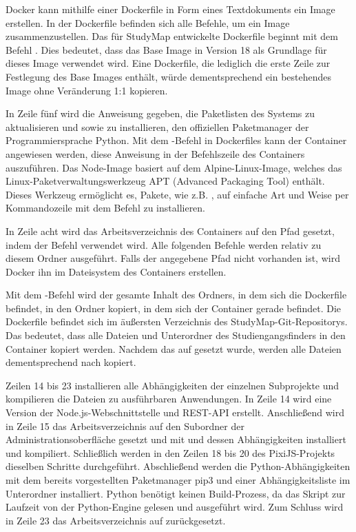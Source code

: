 Docker kann mithilfe einer Dockerfile in Form eines Textdokuments ein Image erstellen. In der Dockerfile befinden sich alle Befehle, um ein Image zusammenzustellen. \parencite{docker_inc_dockerfile_2024} Das für StudyMap entwickelte Dockerfile beginnt mit dem Befehl . Dies bedeutet, dass das Base Image  in Version 18 als Grundlage für dieses Image verwendet wird. Eine Dockerfile, die lediglich die erste Zeile zur Festlegung des Base Images enthält, würde dementsprechend ein bestehendes Image ohne Veränderung 1:1 kopieren. \parencite{the_nodejs_docker_team_node_2024}

In Zeile fünf wird die Anweisung gegeben, die Paketlisten des Systems zu aktualisieren und  sowie  zu installieren, den offiziellen Paketmanager der Programmiersprache Python. \parencite{the_pip_developers_pip_2024} Mit dem -Befehl in Dockerfiles kann der Container angewiesen werden, diese Anweisung in der Befehlszeile des Containers auszuführen. Das Node-Image basiert auf dem Alpine-Linux-Image, welches das Linux-Paketverwaltungswerkzeug APT (Advanced Packaging Tool) enthält. \parencite{the_nodejs_docker_team_node_2024} Dieses Werkzeug ermöglicht es, Pakete, wie z.B. , auf einfache Art und Weise per Kommandozeile mit dem Befehl  zu installieren. \parencite{canonical_ltd_ubuntu_package_2024}

In Zeile acht wird das Arbeitsverzeichnis des Containers auf den Pfad  gesetzt, indem der Befehl  verwendet wird. Alle folgenden Befehle werden relativ zu diesem Ordner ausgeführt. Falls der angegebene Pfad nicht vorhanden ist, wird Docker ihn im Dateisystem des Containers erstellen. \parencite{docker_inc_dockerfile_2024}

Mit dem -Befehl wird der gesamte Inhalt des Ordners, in dem sich die Dockerfile befindet, in den Ordner kopiert, in dem sich der Container gerade befindet. \parencite{docker_inc_dockerfile_2024} Die Dockerfile befindet sich im äußersten Verzeichnis des StudyMap-Git-Repositorys. Das bedeutet, dass alle Dateien und Unterordner des Studiengangsfinders in den Container kopiert werden. Nachdem das  auf  gesetzt wurde, werden alle Dateien dementsprechend nach  kopiert.

Zeilen 14 bis 23 installieren alle Abhängigkeiten der einzelnen Subprojekte und kompilieren die Dateien zu ausführbaren Anwendungen. In Zeile 14 wird eine Version der Node.js-Webschnittstelle und REST-API erstellt. Anschließend wird in Zeile 15 das Arbeitsverzeichnis auf den Subordner der Administrationsoberfläche gesetzt und mit  und  dessen Abhängigkeiten installiert und kompiliert. Schließlich werden in den Zeilen 18 bis 20 des PixiJS-Projekts dieselben Schritte durchgeführt. Abschließend werden die Python-Abhängigkeiten mit dem bereits vorgestellten Paketmanager pip3 und einer Abhängigkeitsliste im Unterordner  installiert. Python benötigt keinen Build-Prozess, da das Skript zur Laufzeit von der Python-Engine gelesen und ausgeführt wird. Zum Schluss wird in Zeile 23 das Arbeitsverzeichnis auf  zurückgesetzt.

